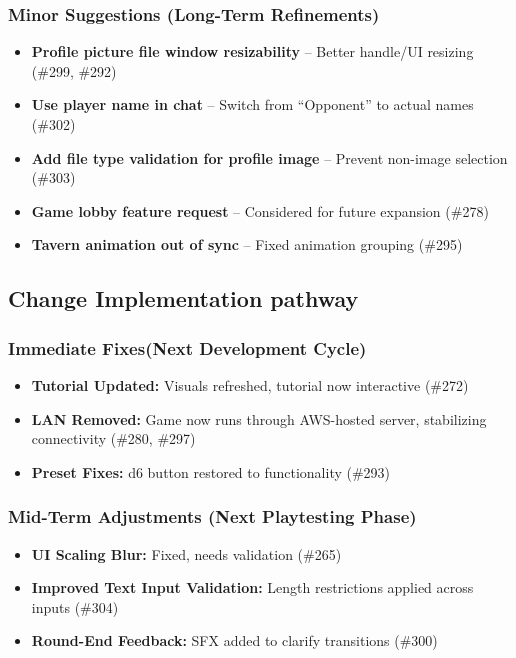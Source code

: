 \documentclass{article}
\begin{document}
\subsubsection{Minor Suggestions (Long-Term Refinements)}
\begin{itemize}
    \item \textbf{Profile picture file window resizability} – Better handle/UI resizing (\#299, \#292)
    \item \textbf{Use player name in chat} – Switch from “Opponent” to actual names (\#302)
    \item \textbf{Add file type validation for profile image} – Prevent non-image selection (\#303)
    \item \textbf{Game lobby feature request} – Considered for future expansion (\#278)
    \item \textbf{Tavern animation out of sync} – Fixed animation grouping (\#295)
\end{itemize}

\subsection{Change Implementation pathway}

\subsubsection{Immediate Fixes(Next Development Cycle)}
\begin{itemize}
    \item \textbf{Tutorial Updated:} Visuals refreshed, tutorial now interactive (\#272)
    \item \textbf{LAN Removed:} Game now runs through AWS-hosted server, stabilizing connectivity (\#280, \#297)
    \item \textbf{Preset Fixes:} d6 button restored to functionality (\#293)
\end{itemize}

\subsubsection{Mid-Term Adjustments (Next Playtesting Phase)}
\begin{itemize}
    \item \textbf{UI Scaling Blur:} Fixed, needs validation (\#265)
    \item \textbf{Improved Text Input Validation:} Length restrictions applied across inputs (\#304)
    \item \textbf{Round-End Feedback:} SFX added to clarify transitions (\#300)
\end{itemize}
\end{document}
